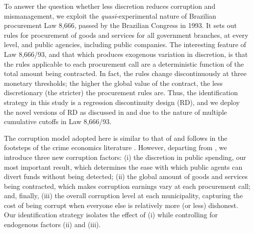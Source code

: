 \documentclass[11pt]{article}
\begin{document}
To answer the question whether less discretion reduces corruption and mismanagement, we exploit the \emph{quasi}-experimental nature of Brazilian procurement Law 8,666, passed by the Brazilian Congress in 1993. It sets out rules for procurement of goods and services for all government branches, at every level, and public agencies, including public companies. The interesting feature of Law 8,666/93, and that which produces exogenous variation in discretion, is that the rules applicable to each procurement call are a deterministic function of the total amount being contracted. In fact, the rules change discontinuously at three monetary thresholds; the higher the global value of the contract, the less discretionary (the stricter) the procurement rules are. Thus, the identification strategy in this study is a regression discontinuity design (RD), and we deploy the novel versions of RD as discussed in \citet{CalonicoRobustNonparametricConfidence2014,CalonicoOptimalDataDrivenRegression2015} and \citet{CattaneoInterpretingRegressionDiscontinuity2016,CattaneoAnalysisRegressionDiscontinuity2018} due to the nature of multiple cumulative cutoffs in Law 8,666/93.

The corruption model adopted here is similar to that of \citet{OlkenCorruptionDevelopingCountries2012b} and follows in the footsteps of the crime economics literature \citep{BeckerCrimePunishmentEconomic1968,StiglerOptimumEnforcementLaws1970,BeckerLawEnforcementMalfeasance1974,Rose-AckermanEconomicsCorruption1975}. However, departing from \citet{OlkenCorruptionDevelopingCountries2012b}, we introduce three new corruption factors: (i) the discretion in public spending, our most important result, which determines the ease with which public agents can divert funds without being detected; (ii) the global amount of goods and services being contracted, which makes corruption earnings vary at each procurement call; and, finally, (iii) the overall corruption level at each municipality, capturing the cost of being corrupt when everyone else is relatively more (or less) dishonest. Our identification strategy isolates the effect of (i) while controlling for endogenous factors (ii) and (iii).
\end{document}
